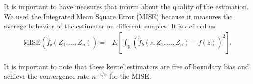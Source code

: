 \documentclass[twocolumn]{svjour3}
\begin{document}
It is important to have measures that inform about the quality of the estimation. 
We used the Integrated Mean Square Error (MISE) because it measures the average behavior of the estimator on different samples. 
It is defined as
\begin{align}
\label{Mise}
\text{MISE}(\widehat{f}_b(Z_1,\ldots,Z_n))=&E\left[\int_\mathbb{R} (\widehat{f}_b(z,Z_1,\ldots,Z_n)-f(z))^2 \right].
\end{align}

It is important to note that these kernel estimators are free of boundary bias and achieve the convergence rate $n^{-4/5}$ for the MISE.


%	
\end{document}
